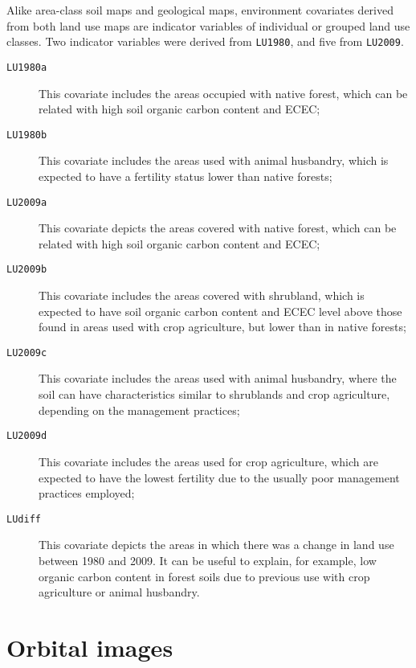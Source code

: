 Alike area-class soil maps and geological maps, environment covariates derived from both land use maps are indicator variables of individual or grouped land use classes. Two indicator variables were derived from \texttt{LU1980}, and five from \texttt{LU2009}.

\begin{description}
  \item[\texttt{LU1980a}] This covariate includes the areas occupied with native forest, which can be related with high soil organic carbon content and ECEC;
  
  \item[\texttt{LU1980b}] This covariate includes the areas used with animal husbandry, which is expected to have a fertility status lower than native forests;
\end{description}


\begin{description}
  \item[\texttt{LU2009a}] This covariate depicts the areas covered with native forest, which can be related with high soil organic carbon content and ECEC;
  
  \item[\texttt{LU2009b}] This covariate includes the areas covered with shrubland, which is expected to have soil organic carbon content and ECEC level above those found in areas used with crop agriculture, but lower than in native forests;
  
  \item[\texttt{LU2009c}] This covariate includes the areas used with animal husbandry, where the soil can have characteristics similar to shrublands and crop agriculture, depending on the management practices;
  
  \item[\texttt{LU2009d}] This covariate includes the areas used for crop agriculture, which are expected to have the lowest fertility due to the usually poor management practices employed;
  
  \item[\texttt{LUdiff}] This covariate depicts the areas in which there was a change in land use between 1980 and 2009. It can be useful to explain, for example, low organic carbon content in forest soils due to previous use with crop agriculture or animal husbandry.
\end{description}

\tocless\section{Orbital images}
\label{sec:covar-data-sat-image}

